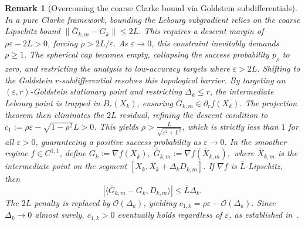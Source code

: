 \documentclass[11pt,a4paper]{article}
\newtheorem{remark}{Remark}[section]
\newcommand{\goldelta}{r}
\newcommand{\sara}[1]{{\color{red}{\textbf{[SS: #1]}}\color{black}}}
\begin{document}
\begin{remark}[Overcoming the coarse Clarke bound via Goldstein subdifferentials]%
\label{rem:rescale-Lipschitz}
In a pure Clarke framework, bounding the Lebourg subgradient relies on the coarse Lipschitz bound $\|\bar G_{k,m}-G_k\|\le 2L$. This requires a descent margin of $\rho\varepsilon-2L>0$, forcing $\rho > 2L/\varepsilon$. As $\varepsilon \to 0$, this constraint inevitably demands $\rho \ge 1$. The spherical cap becomes empty, collapsing the success probability $p_\rho$ to zero, and restricting the analysis to low-accuracy targets where $\varepsilon > 2L$. Shifting to the Goldstein $\goldelta$-subdifferential resolves this topological barrier. By targeting an $(\varepsilon, \goldelta)$-Goldstein stationary point and restricting $\Delta_k \le \goldelta$, the intermediate Lebourg point is trapped in $B_\goldelta(X_k)$, ensuring $\bar G_{k,m} \in \partial_\goldelta f(X_k)$. The projection theorem then eliminates the $2L$ residual, refining the descent condition to $c_1 := \rho\varepsilon - \sqrt{1-\rho^2}L > 0$. This yields $\rho > \frac{L}{\sqrt{\varepsilon^2 + L^2}}$, which is strictly less than $1$ for all $\varepsilon > 0$, guaranteeing a positive success probability as $\varepsilon \to 0$. In the smoother regime \(f\in C^{1,1}\), define 
\(
    G_k:=\nabla f(X_k),
    \;
    \bar G_{k,m}:=\nabla f(\bar X_{k,m}),
\)
where \(\bar X_{k,m}\) is the intermediate point on the segment
\([X_k,X_k+\Delta_kD_{k,m}]\). If \(\nabla f\) is
\(\bar L\)-Lipschitz, then
\[
    \left|
    \langle \bar G_{k,m}-G_k,D_{k,m}\rangle
    \right|
    \le
    \bar L\Delta_k.
\]
The $2L$ penalty is replaced by $\mathcal{O}(\Delta_k)$, yielding $c_{1,k}=\rho\varepsilon-\mathcal{O}(\Delta_k)$. Since $\Delta_k\to 0$ almost surely, $c_{1,k}>0$ eventually holds regardless of $\varepsilon$, as established in~\cite{MR4359469}.
\end{remark}
\end{document}
